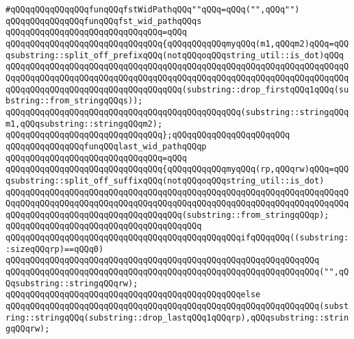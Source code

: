 \newline
\newline
\verb|#qQQqqQQqqQQqqQQqfunqQQqfstWidPathqQQq""qQQq=qQQq("",qQQq"")|\newline
\newline
\newline
\verb|qQQqqQQqqQQqqQQqfunqQQqfst_wid_pathqQQqs|\newline
\verb|qQQqqQQqqQQqqQQqqQQqqQQqqQQqqQQq=qQQq|\newline
\verb|qQQqqQQqqQQqqQQqqQQqqQQqqQQqqQQq{qQQqqQQqqQQqmyqQQq(m1,qQQqm2)qQQq=qQQqsubstring::split_off_prefixqQQq(notqQQqoqQQqstring_util::is_dot)qQQq|\newline
\verb|qQQqqQQqqQQqqQQqqQQqqQQqqQQqqQQqqQQqqQQqqQQqqQQqqQQqqQQqqQQqqQQqqQQqqQQqqQQqqQQqqQQqqQQqqQQqqQQqqQQqqQQqqQQqqQQqqQQqqQQqqQQqqQQqqQQqqQQqqQQqqQQqqQQqqQQqqQQqqQQqqQQqqQQqqQQqqQQq(substring::drop_firstqQQq1qQQq(substring::from_stringqQQqs));|\newline
\verb|qQQqqQQqqQQqqQQqqQQqqQQqqQQqqQQqqQQqqQQqqQQqqQQq(substring::stringqQQqm1,qQQqsubstring::stringqQQqm2);|\newline
\verb|qQQqqQQqqQQqqQQqqQQqqQQqqQQqqQQq};qQQqqQQqqQQqqQQqqQQqqQQq|\newline
\newline
\verb|qQQqqQQqqQQqqQQqfunqQQqlast_wid_pathqQQqp|\newline
\verb|qQQqqQQqqQQqqQQqqQQqqQQqqQQqqQQq=qQQq|\newline
\verb|qQQqqQQqqQQqqQQqqQQqqQQqqQQqqQQq{qQQqqQQqqQQqmyqQQq(rp,qQQqrw)qQQq=qQQqsubstring::split_off_suffixqQQq(notqQQqoqQQqstring_util::is_dot)|\newline
\verb|qQQqqQQqqQQqqQQqqQQqqQQqqQQqqQQqqQQqqQQqqQQqqQQqqQQqqQQqqQQqqQQqqQQqqQQqqQQqqQQqqQQqqQQqqQQqqQQqqQQqqQQqqQQqqQQqqQQqqQQqqQQqqQQqqQQqqQQqqQQqqQQqqQQqqQQqqQQqqQQqqQQqqQQqqQQqqQQq(substring::from_stringqQQqp);|\newline
\verb|qQQqqQQqqQQqqQQqqQQqqQQqqQQqqQQqqQQqqQQq|\newline
\verb|qQQqqQQqqQQqqQQqqQQqqQQqqQQqqQQqqQQqqQQqqQQqqQQqifqQQqqQQq((substring::sizeqQQqrp)==qQQq0)|\newline
\verb|qQQqqQQqqQQqqQQqqQQqqQQqqQQqqQQqqQQqqQQqqQQqqQQqqQQqqQQqqQQqqQQq|\newline
\verb|qQQqqQQqqQQqqQQqqQQqqQQqqQQqqQQqqQQqqQQqqQQqqQQqqQQqqQQqqQQqqQQq("",qQQqsubstring::stringqQQqrw);|\newline
\verb|qQQqqQQqqQQqqQQqqQQqqQQqqQQqqQQqqQQqqQQqqQQqqQQqelse|\newline
\verb|qQQqqQQqqQQqqQQqqQQqqQQqqQQqqQQqqQQqqQQqqQQqqQQqqQQqqQQqqQQqqQQq(substring::stringqQQq(substring::drop_lastqQQq1qQQqrp),qQQqsubstring::stringqQQqrw);|\newline
